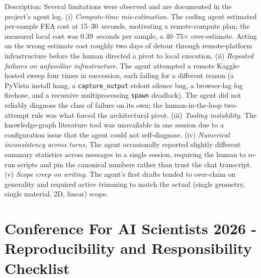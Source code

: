 \documentclass{article}
\begin{document}
\begin{enumerate}
    Description: Several limitations were observed and are documented in the project's agent log. (i) \emph{Compute-time mis-estimation.} The coding agent estimated per-sample FEA cost at 15--30~seconds, motivating a remote-compute plan; the measured local cost was 0.39~seconds per sample, a 40--75$\times$ over-estimate. Acting on the wrong estimate cost roughly two days of detour through remote-platform infrastructure before the human directed a pivot to local execution. (ii) \emph{Repeated failures on unfamiliar infrastructure.} The agent attempted a remote Kaggle-hosted sweep four times in succession, each failing for a different reason (a PyVista install hang, a \texttt{capture\_output} stdout silence bug, a browser-lag log firehose, and a recursive multiprocessing \texttt{spawn} deadlock). The agent did not reliably diagnose the class of failure on its own; the human-in-the-loop two-attempt rule was what forced the architectural pivot. (iii) \emph{Tooling instability.} The knowledge-graph literature tool was unavailable in one session due to a configuration issue that the agent could not self-diagnose. (iv) \emph{Numerical inconsistency across turns.} The agent occasionally reported slightly different summary statistics across messages in a single session, requiring the human to re-run scripts and pin the canonical numbers rather than trust the chat transcript. (v) \emph{Scope creep on writing.} The agent's first drafts tended to over-claim on generality and required active trimming to match the actual (single geometry, single material, 2D, linear) scope.

\end{enumerate}

\newpage

\section*{Conference For AI Scientists 2026 - Reproducibility and Responsibility Checklist}
\label{checklist_reproducibility}
\end{document}
